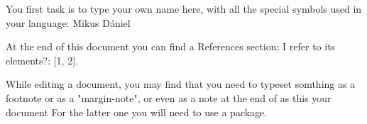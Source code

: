 \documentclass[12pt]{article}
\begin{document}
\par
You first task is to type your own name here, with all the special symbols used in your language: Mikus Dániel \par
At the end of this document you can find a References section; I refer to its elements?: [1, 2]. \par
While editing a document, you may find that you need to typeset somthing as a footnote or as a "margin-note", or even as a note at the end of as this your document For the latter one you will need to use a package.
\end{document}
